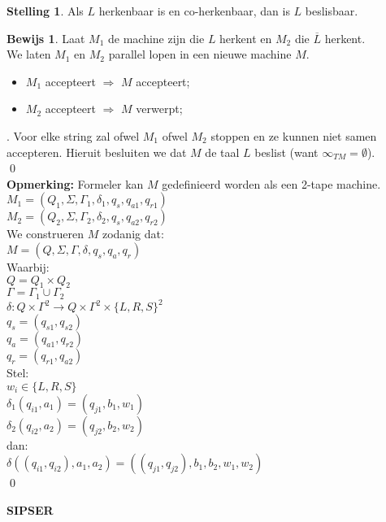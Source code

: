 \documentclass[12pt,a4paper]{article}
\theoremstyle{definition}
\newtheorem{stel}{Stelling}[section]
\newtheorem{bewijs}{Bewijs}[section]
\newcommand{\ra}{\ensuremath{\rightarrow}}
\begin{document}
	\begin{stel}
		Als $L$ herkenbaar is en co-herkenbaar, dan is $L$ beslisbaar.
		\begin{bewijs}
			Laat $M_1$ de machine zijn die $L$ herkent en $M_2$ die $\overline{L}$ herkent.\\
			We laten $M_1$ en $M_2$ parallel lopen in een nieuwe machine $M$. \begin{itemize}
				\item $M_1$ accepteert $\Rightarrow$ $M$ accepteert;
				\item $M_2$ accepteert $\Rightarrow$ $M$ verwerpt;
			\end{itemize}.
			Voor elke string zal ofwel $M_1$ ofwel $M_2$ stoppen en ze kunnen niet samen accepteren. Hieruit besluiten we dat $M$ de taal $L$ beslist (want $\infty_{TM} = \emptyset$).\\
			\qed\\
			\textbf{Opmerking:} Formeler kan $M$ gedefinieerd worden als een 2-tape machine.\\
			$M_1 = (Q_1,\Sigma,\Gamma_1,\delta_1,q_s,q_{a1},q_{r1})$\\
			$M_2 = (Q_2,\Sigma,\Gamma_2,\delta_2,q_s,q_{a2},q_{r2})$\\
			
			We construeren $M$ zodanig dat:\\
			$M = (Q,\Sigma,\Gamma, \delta, q_s, q_a, q_r)$\\
			
			Waarbij:\\
			$Q = Q_1 \times Q_2$\\
			$\Gamma = \Gamma_1 \cup \Gamma_2$\\
			$\delta: Q\times \Gamma^2 \ra Q\times \Gamma^2 \times \{L,R,S\}^2$\\
			$q_s = (q_{s1},q_{s2})$\\
			$q_a = (q_{a1},q_{r2})$\\
			$q_r = (q_{r1}, q_{a2})$\\
			
			Stel:\\
			$w_i\in \{L,R,S\}$\\
			$\delta_1(q_{i1},a_1) = (q_{j1},b_1,w_1)$\\
			$\delta_2(q_{i2},a_2) = (q_{j2},b_2,w_2)$\\
			
			dan:\\
			$\delta((q_{i1},q_{i2}),a_1,a_2) = ((q_{j1},q_{j2}),b_1,b_2,w_1,w_2)$\\
			\qed
		\end{bewijs}
	\end{stel}
\textbf{\LARGE SIPSER}
\end{document}
